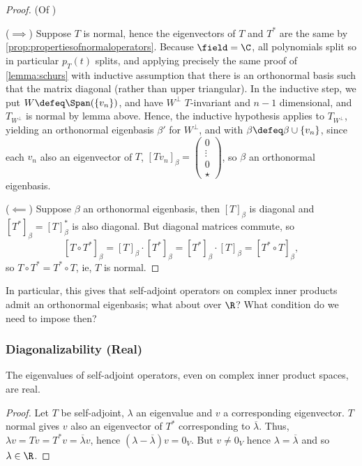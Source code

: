 \begin{proof}(Of )

    ($\implies$) Suppose $T$ is normal, hence the eigenvectors of $T$ and $T^\ast$ are the same by \cref{prop:propertiesofnormaloperators}. Because $\field  = \C$, all polynomials split so in particular $p_T(t)$ splits, and applying precisely the same proof of \cref{lemma:schurs} with inductive assumption that there is an orthonormal basis such that the matrix diagonal (rather than upper triangular). In the inductive step, we put $W \defeq \Span (\{v_n\})$, and have $W^\perp$ $T$-invariant and $n - 1$ dimensional, and $T_{W^\perp}$ is normal by lemma above. Hence, the inductive hypothesis applies to $T_{W^\perp}$, yielding an orthonormal eigenbasis $\beta'$ for $W^\perp$, and  with $\beta \defeq \beta \cup \{v_n\}$, since each $v_n$ also an eigenvector of $T$, $[Tv_n]_\beta = \begin{pmatrix}
        0 \\
        \vdots\\
        0\\
        \star
    \end{pmatrix}$, so $\beta$ an orthonormal eigenbasis.

    ($\impliedby$) Suppose $\beta$ an orthonormal eigenbasis, then $[T]_\beta$ is diagonal and $[T^\ast]_\beta = [T]_\beta^\ast$ is also diagonal. But diagonal matrices commute, so \[
    [T \circ T^\ast]_\beta = [T]_\beta \cdot [T^\ast]_\beta = [T^\ast]_\beta \cdot [T]_\beta = [T^\ast \circ T]_\beta,    
    \]
    so $T\circ T^\ast = T^\ast \circ T$, ie, $T$ is normal.
\end{proof}

In particular, this gives that self-adjoint operators on complex inner products admit an orthonormal eigenbasis; what about over $\R$? What condition do we need to impose then?
\subsubsection{Diagonalizability (Real)}
\begin{lemma}
    The eigenvalues of self-adjoint operators, even on complex inner product spaces, are real.
\end{lemma}

\begin{proof}
    Let $T$ be self-adjoint, $\lambda$ an eigenvalue and $v$ a corresponding eigenvector. $T$ normal gives $v$ also an eigenvector of $T^\ast$ corresponding to $\overline{\lambda}$. Thus, $\lambda v = Tv = T^\ast v = \overline{\lambda}v$, hence $(\lambda - \overline{\lambda})v = 0_V$. But $v \neq 0_V$ hence $\lambda = \overline{\lambda}$ and so $\lambda \in \R$.
\end{proof}

